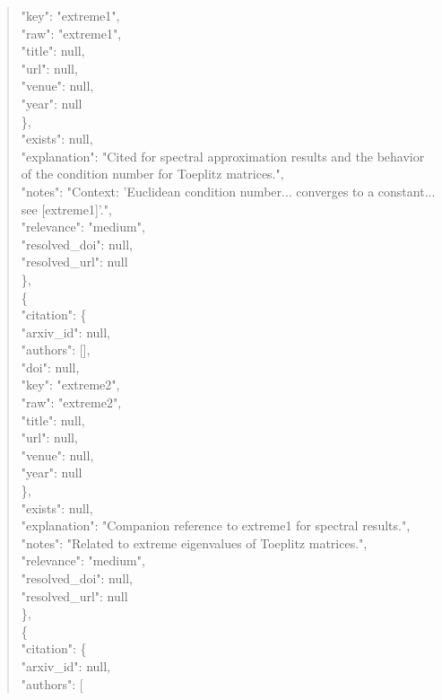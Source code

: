 \documentclass[11pt]{article}
\begin{document}
\begin{quote}
        "key": "extreme1",\\
        "raw": "extreme1",\\
        "title": null,\\
        "url": null,\\
        "venue": null,\\
        "year": null\\
      \},\\
      "exists": null,\\
      "explanation": "Cited for spectral approximation results and the behavior of the condition number for Toeplitz matrices.",\\
      "notes": "Context: 'Euclidean condition number... converges to a constant... see [extreme1]'.",\\
      "relevance": "medium",\\
      "resolved\_doi": null,\\
      "resolved\_url": null\\
    \},\\
    \{\\
      "citation": \{\\
        "arxiv\_id": null,\\
        "authors": [],\\
        "doi": null,\\
        "key": "extreme2",\\
        "raw": "extreme2",\\
        "title": null,\\
        "url": null,\\
        "venue": null,\\
        "year": null\\
      \},\\
      "exists": null,\\
      "explanation": "Companion reference to extreme1 for spectral results.",\\
      "notes": "Related to extreme eigenvalues of Toeplitz matrices.",\\
      "relevance": "medium",\\
      "resolved\_doi": null,\\
      "resolved\_url": null\\
    \},\\
    \{\\
      "citation": \{\\
        "arxiv\_id": null,\\
        "authors": [\\

\end{quote}
\end{document}
